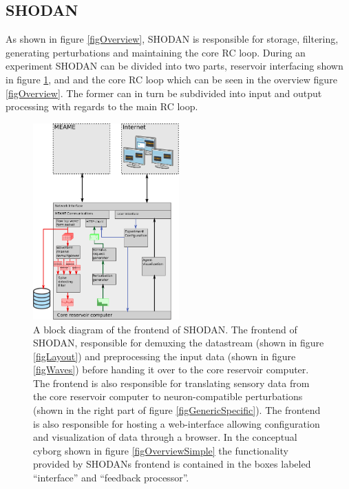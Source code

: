 \subsection{SHODAN}
As shown in figure \ref{figOverview}, SHODAN is responsible for storage, filtering,
generating perturbations and maintaining the core RC loop.
During an experiment SHODAN can be divided into two parts, reservoir interfacing
shown in figure \ref{figSHODANiface}, and and the core RC loop which can be seen
in the overview figure \ref{figOverview}.
The former can in turn be subdivided into input and output processing with
regards to the main RC loop.
\begin{figure}[h!]
  \centering
  \includegraphics[width=0.5\textwidth]{fig/SHODANfrontend.png}
  \caption{
    A block diagram of the frontend of SHODAN.
    The frontend of SHODAN, responsible for demuxing the datastream (shown in
    figure \ref{figLayout}) and
    preprocessing the input data (shown in figure \ref{figWaves}) before handing it
    over to the core reservoir computer.
    The frontend is also responsible for translating sensory data from the core
    reservoir computer to neuron-compatible perturbations (shown in the right
    part of figure \ref{figGenericSpecific}).
    The frontend is also responsible for hosting a web-interface allowing
    configuration and visualization of data through a browser.
    In the conceptual cyborg shown in figure \ref{figOverviewSimple} the
    functionality provided by SHODANs frontend is contained in the boxes labeled
    ``interface'' and ``feedback processor''.
  }
  \label{figSHODANiface}
\end{figure}

